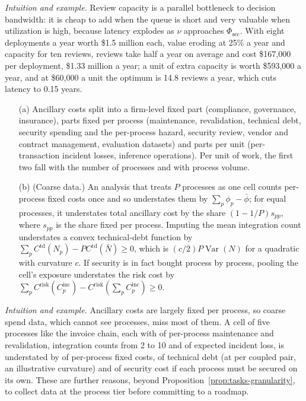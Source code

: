 \noindent\emph{Intuition and example.} Review capacity is a parallel bottleneck to decision bandwidth: it is cheap to add when the queue is short and very valuable when utilization is high, because latency explodes as $\nu$ approaches $\Phi_{\mathrm{sec}}$. With eight deployments a year worth \$1.5 million each, value eroding at 25\% a year and capacity for ten reviews, reviews take half a year on average and cost \$167{,}000 per deployment, \$1.33 million a year; a unit of extra capacity is worth \$593{,}000 a year, and at \$60{,}000 a unit the optimum is 14.8 reviews a year, which cuts latency to 0.15 years.

\begin{proposition}\label{prop:tasks-ancscale}
\begin{enumerate}
\item[(a)] Ancillary costs split into a firm-level fixed part (compliance, governance, insurance), parts fixed per process (maintenance, revalidation, technical debt, security spending and the per-process hazard, security review, vendor and contract management, evaluation datasets) and parts per unit (per-transaction incident losses, inference operations). Per unit of work, the first two fall with the number of processes and with process volume.
\item[(b)] (Coarse data.) An analysis that treats $P$ processes as one cell counts per-process fixed costs once and so understates them by $\sum_p\phi_p-\bar\phi$; for equal processes, it understates total ancillary cost by the share $(1-1/P)s_{pp}$, where $s_{pp}$ is the share fixed per process. Imputing the mean integration count understates a convex technical-debt function by $\sum_pC^{\mathrm{td}}(N_p)-PC^{\mathrm{td}}(\bar N)\ge 0$, which is $(c/2)P\operatorname{Var}(N)$ for a quadratic with curvature $c$. If security is in fact bought process by process, pooling the cell's exposure understates the risk cost by $\sum_pC^{\mathrm{risk}}(C^{\mathrm{inc}}_p)-C^{\mathrm{risk}}(\sum_pC^{\mathrm{inc}}_p)\ge 0$.
\end{enumerate}
\end{proposition}

\noindent\emph{Intuition and example.} Ancillary costs are largely fixed per process, so coarse spend data, which cannot see processes, miss most of them. A cell of five processes like the invoice chain, each with \icScalePer{} of per-process maintenance and revalidation, integration counts from 2 to 10 and \icCinc{} of expected incident loss, is understated by \icScaleFixed{} of per-process fixed costs, \icScaleJensen{} of technical debt (at \icScaleCurv{} per coupled pair, an illustrative curvature) and \icScalePool{} of security cost if each process must be secured on its own. These are further reasons, beyond Proposition~\ref{prop:tasks-granularity}, to collect data at the process tier before committing to a roadmap.

